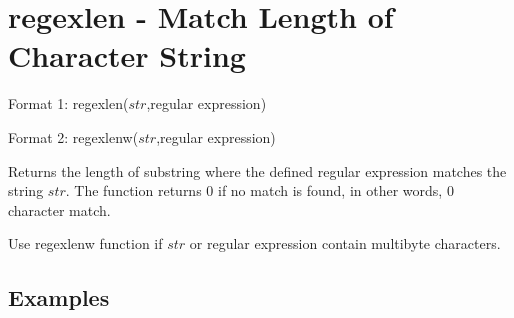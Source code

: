 
%

\section{regexlen - Match Length of Character String\label{sect:regexlen}}

Format 1: regexlen($str$,regular expression)

Format 2: regexlenw($str$,regular expression)


Returns the length of substring where the defined regular expression matches the string $str$. The function returns 0 if no match is found, in other words, 0 character match. 

Use regexlenw function if $str$ or regular expression contain multibyte characters. 



\subsection*{Examples}


%


